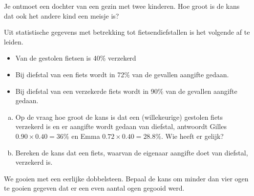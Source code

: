 \documentclass[12pt,twoside]{article}
\begin{document}
\begin{oefening}
Je ontmoet een dochter van een gezin met twee kinderen. Hoe groot is de kans dat ook het andere kind een meisje is?
\end{oefening}

\begin{oefening} %
Uit statistische gegevens met betrekking tot fietsendiefstallen is het volgende af te leiden.
\begin{itemize}
  \item Van de gestolen fietsen is 40\% verzekerd
  \item Bij diefstal van een fiets wordt in 72\% van de gevallen aangifte gedaan.
  \item Bij diefstal van een verzekerde fiets wordt in 90\% van de gevallen aangifte gedaan.
\end{itemize}
\begin{enumerate}[(a)]
  \item Op de vraag hoe groot de kans is dat een (willekeurige) gestolen fiets verzekerd is en er aangifte wordt gedaan van diefstal, antwoordt Gilles $0.90\times0.40 = 36\%$ en Emma $0.72\times0.40 = 28.8\%$. Wie heeft er gelijk? 
  \item Bereken de kans dat een fiets, waarvan de eigenaar aangifte doet van diefstal, verzekerd is.
\end{enumerate}
\end{oefening}

\begin{oefening}
We gooien met een eerlijke dobbelsteen. Bepaal de kans om minder dan vier ogen te gooien gegeven dat er een even aantal ogen gegooid werd.
\end{oefening}
\end{document}
